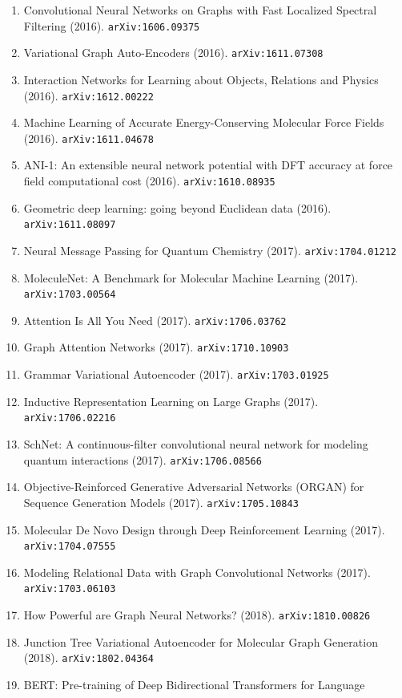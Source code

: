 \documentclass[11pt]{article}
\begin{document}
\begin{enumerate}
  \item Convolutional Neural Networks on Graphs with Fast Localized Spectral
  Filtering (2016). \texttt{arXiv:1606.09375}
  \item Variational Graph Auto-Encoders (2016). \texttt{arXiv:1611.07308}
  \item Interaction Networks for Learning about Objects, Relations and Physics (2016). \texttt{arXiv:1612.00222}
  \item Machine Learning of Accurate Energy-Conserving Molecular Force Fields (2016). \texttt{arXiv:1611.04678}
  \item ANI-1: An extensible neural network potential with DFT accuracy at force
  field computational cost (2016). \texttt{arXiv:1610.08935}
  \item Geometric deep learning: going beyond Euclidean data (2016). \texttt{arXiv:1611.08097}
  \item Neural Message Passing for Quantum Chemistry (2017). \texttt{arXiv:1704.01212}
  \item MoleculeNet: A Benchmark for Molecular Machine Learning (2017). \texttt{arXiv:1703.00564}
  \item Attention Is All You Need (2017). \texttt{arXiv:1706.03762}
  \item Graph Attention Networks (2017). \texttt{arXiv:1710.10903}
  \item Grammar Variational Autoencoder (2017). \texttt{arXiv:1703.01925}
  \item Inductive Representation Learning on Large Graphs (2017). \texttt{arXiv:1706.02216}
  \item SchNet: A continuous-filter convolutional neural network for modeling
  quantum interactions (2017). \texttt{arXiv:1706.08566}
  \item Objective-Reinforced Generative Adversarial Networks (ORGAN) for
  Sequence Generation Models (2017). \texttt{arXiv:1705.10843}
  \item Molecular De Novo Design through Deep Reinforcement Learning (2017). \texttt{arXiv:1704.07555}
  \item Modeling Relational Data with Graph Convolutional Networks (2017). \texttt{arXiv:1703.06103}
  \item How Powerful are Graph Neural Networks? (2018). \texttt{arXiv:1810.00826}
  \item Junction Tree Variational Autoencoder for Molecular Graph Generation (2018). \texttt{arXiv:1802.04364}
  \item BERT: Pre-training of Deep Bidirectional Transformers for Language

\end{enumerate}
\end{document}
